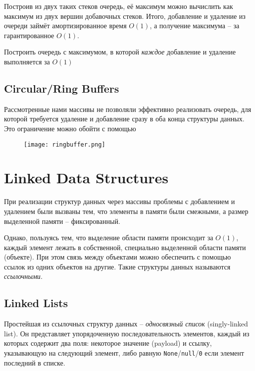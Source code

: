 Построив из двух таких стеков очередь, её максимум можно вычислить как максимум из двух вершин добавочных стеков. Итого, добавление и удаление из очереди займёт амортизированное время $O(1)$, а получение максимума -- за гарантированное $O(1)$.

\begin{problem}
Построить очередь с максимумом, в которой {\em каждое} добавление и удаление выполняется за $O(1)$
\end{problem}

\subsection*{Circular/Ring Buffers}

Рассмотренные нами массивы не позволяли эффективно реализовать очередь, для которой требуется удаление и добавление сразу в оба конца структуры данных. Это ограничение можно обойти с помощью 

\begin{figure}[!ht]
\centering
\texttt{[image: ringbuffer.png]}
\end{figure}


\section{Linked Data Structures}

При реализации структур данных через массивы проблемы с добавлением и удалением были вызваны тем, что элементы в памяти были смежными, а размер выделенной памяти -- фиксированный.

Однако, пользуясь тем, что выделение области памяти происходит за $O(1)$, каждый элемент лежать в собственной, специально выделенной области памяти (объекте). При этом связь между объектами можно обеспечить с помощью ссылок из одних объектов на другие. Такие структуры данных называются {\em ссылочными}.

\subsection*{Linked Lists}

Простейшая из ссылочных структур данных -- {\em односвязный список} (singly-linked list). Он представляет упорядоченную последовательность элементов, каждый из которых содержит два поля: некоторое значение (payload) и ссылку, указывающую на следующий элемент, либо равную {\tt None}/{\tt null}/{\tt 0} если элемент последний в списке.

